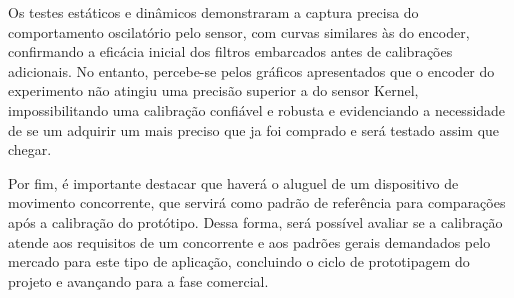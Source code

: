 \documentclass[a4paper, 12pt]{article}
\begin{document}
    Os testes estáticos e dinâmicos demonstraram a captura precisa do comportamento oscilatório pelo sensor, com curvas similares às do encoder, confirmando a eficácia inicial dos filtros embarcados antes de calibrações adicionais. No entanto, percebe-se pelos gráficos apresentados que o encoder do experimento não atingiu uma precisão superior a do sensor Kernel, impossibilitando uma calibração confiável e robusta e evidenciando a necessidade de se um adquirir um mais preciso que ja foi comprado e será testado assim que chegar.

    Por fim, é importante destacar que haverá o aluguel de um dispositivo de movimento concorrente, que servirá como padrão de referência para comparações após a calibração do protótipo. Dessa forma, será possível avaliar se a calibração atende aos requisitos de um concorrente e aos padrões gerais demandados pelo mercado para este tipo de aplicação, concluindo o ciclo de prototipagem do projeto e avançando para a fase comercial.
    
\newpage

\end{document}
